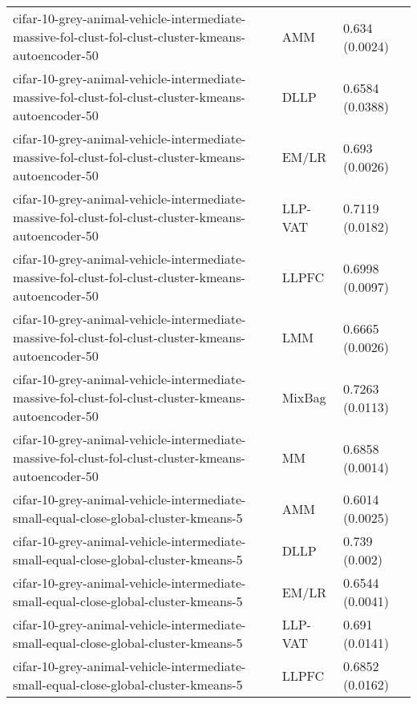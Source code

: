 \begin{longtable}{lll}
          cifar-10-grey-animal-vehicle-intermediate-massive-fol-clust-fol-clust-cluster-kmeans-autoencoder-50 &       AMM &                            0.634 (0.0024) \\
          cifar-10-grey-animal-vehicle-intermediate-massive-fol-clust-fol-clust-cluster-kmeans-autoencoder-50 &      DLLP &                           0.6584 (0.0388) \\
          cifar-10-grey-animal-vehicle-intermediate-massive-fol-clust-fol-clust-cluster-kmeans-autoencoder-50 &     EM/LR &                            0.693 (0.0026) \\
          cifar-10-grey-animal-vehicle-intermediate-massive-fol-clust-fol-clust-cluster-kmeans-autoencoder-50 &   LLP-VAT &                           0.7119 (0.0182) \\
          cifar-10-grey-animal-vehicle-intermediate-massive-fol-clust-fol-clust-cluster-kmeans-autoencoder-50 &     LLPFC &                           0.6998 (0.0097) \\
          cifar-10-grey-animal-vehicle-intermediate-massive-fol-clust-fol-clust-cluster-kmeans-autoencoder-50 &       LMM &                           0.6665 (0.0026) \\
          cifar-10-grey-animal-vehicle-intermediate-massive-fol-clust-fol-clust-cluster-kmeans-autoencoder-50 &    MixBag &                           0.7263 (0.0113) \\
          cifar-10-grey-animal-vehicle-intermediate-massive-fol-clust-fol-clust-cluster-kmeans-autoencoder-50 &        MM &                           0.6858 (0.0014) \\
                          cifar-10-grey-animal-vehicle-intermediate-small-equal-close-global-cluster-kmeans-5 &       AMM &                           0.6014 (0.0025) \\
                          cifar-10-grey-animal-vehicle-intermediate-small-equal-close-global-cluster-kmeans-5 &      DLLP &                             0.739 (0.002) \\
                          cifar-10-grey-animal-vehicle-intermediate-small-equal-close-global-cluster-kmeans-5 &     EM/LR &                           0.6544 (0.0041) \\
                          cifar-10-grey-animal-vehicle-intermediate-small-equal-close-global-cluster-kmeans-5 &   LLP-VAT &                            0.691 (0.0141) \\
                          cifar-10-grey-animal-vehicle-intermediate-small-equal-close-global-cluster-kmeans-5 &     LLPFC &                           0.6852 (0.0162) \\

\end{longtable}
